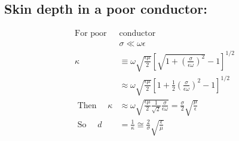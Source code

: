 \subsection{ Skin depth in a poor conductor:}
\begin{align*}
\text{For poor }&\text{conductor}\\
&\sigma \ll \omega \epsilon \\
\kappa &\equiv \omega \sqrt{\frac{\epsilon \mu}{2}}\left[\sqrt{1+\left(\frac{\sigma}{\epsilon \omega}\right)^{2}}-1\right]^{1 / 2} \\
&\approx \omega \sqrt{\frac{\epsilon \mu}{2}}\left[1+\frac{1}{2}\left(\frac{\sigma}{\epsilon \omega}\right)^{2}-1\right]^{1 / 2}\\
\text{ Then }\quad
\kappa &\approx \omega \sqrt{\frac{\epsilon \mu}{2} \frac{1}{\sqrt{2}} \frac{\sigma}{\epsilon \omega}}=\frac{\sigma}{2} \sqrt{\frac{\mu}{\epsilon}}\\
\text{ So }\quad
d&=\frac{1}{\kappa} \cong \frac{2}{\sigma} \sqrt{\frac{\epsilon}{\mu}}
\end{align*}
